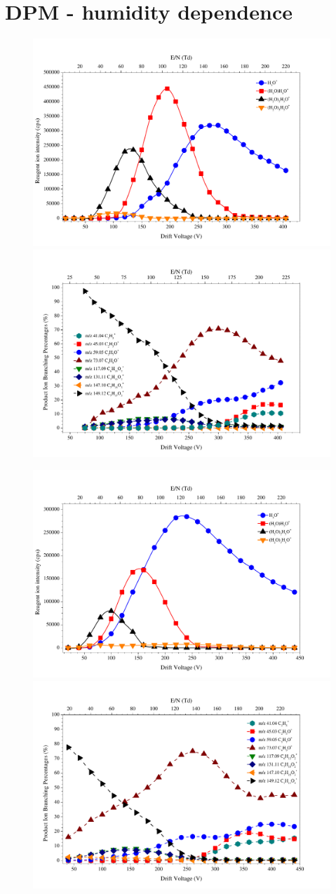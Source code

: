 \section{DPM - humidity dependence}
\begin{figure}%
\centering
\includegraphics[width=0.48\linewidth]{pics/DPM_clusters_littoral.pdf}
\includegraphics[width=0.48\linewidth]{pics/DPM_BR_lit.pdf}

\includegraphics[width=0.48\linewidth]{pics/DPM_clusters_lynx_humid.pdf}
\includegraphics[width=0.48\linewidth]{pics/DPM_humid_DC_lynx.pdf}


\end{figure}
